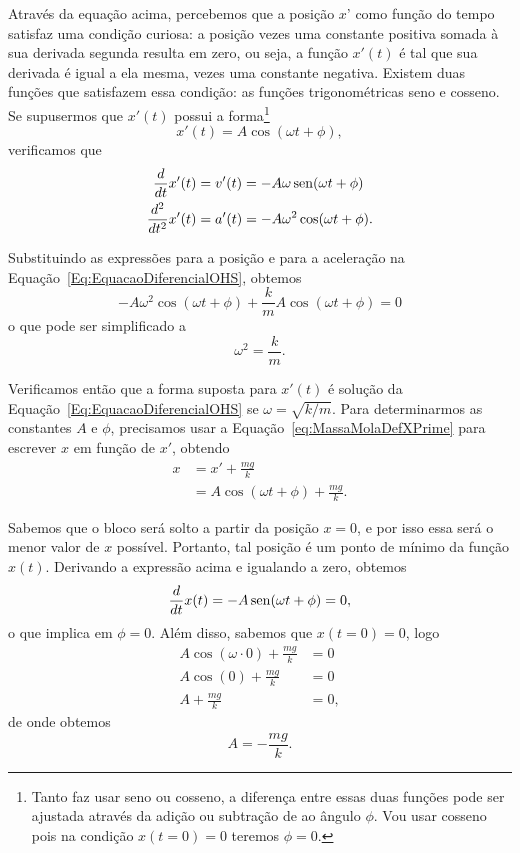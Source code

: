 Através da equação acima, percebemos que a posição $x$' como função do tempo satisfaz uma condição curiosa: a posição vezes uma constante positiva somada à  sua derivada segunda resulta em zero, ou seja, a função $x'(t)$ é tal que sua derivada é igual a ela mesma, vezes uma constante negativa. Existem duas funções que satisfazem essa condição: as funções trigonométricas seno e cosseno. Se supusermos que $x'(t)$ possui a forma\footnote{Tanto faz usar seno ou cosseno, a diferença entre essas duas funções pode ser ajustada através da adição ou subtração de  ao ângulo $\phi$. Vou usar cosseno pois na condição $x(t=0) = 0$ teremos $\phi = 0$.}
\begin{equation}
	x'(t) = A\cos(\omega t + \phi),
\end{equation}
%
verificamos que
\begin{align}
	\frac{d}{dt}x'(t) &= v'(t) = -A\omega\operatorname{sen}(\omega t + \phi) \\
	\frac{d^2}{dt^2} x'(t) &= a'(t) = -A\omega^2\cos(\omega t + \phi).
\end{align}

%
Substituindo as expressões para a posição e para a aceleração na Equação~\eqref{Eq:EquacaoDiferencialOHS}, obtemos
\begin{equation}
	-A\omega^2\cos(\omega t + \phi) + \frac{k}{m}A\cos(\omega t + \phi) = 0
\end{equation}
%
o que pode ser simplificado a
\begin{equation}
	\omega^2 = \frac{k}{m}.
\end{equation}

Verificamos então que a forma suposta para $x'(t)$ é solução da Equação~\eqref{Eq:EquacaoDiferencialOHS} se $\omega = \sqrt{k/m}$. Para determinarmos as constantes $A$ e $\phi$, precisamos usar a Equação~\eqref{eq:MassaMolaDefXPrime} para escrever $x$ em função de $x'$, obtendo
\begin{align}
	x &= x' + \frac{mg}{k} \\
	&= A \cos(\omega t + \phi) + \frac{mg}{k}.
\end{align}

Sabemos que o bloco será solto a partir da posição $x = 0$, e por isso essa será o menor valor de $x$ possível. Portanto, tal posição é um ponto de mínimo da função $x(t)$. Derivando a expressão acima e igualando a zero, obtemos
\begin{equation}
	\frac{d}{dt} x(t) = -A\operatorname{sen}(\omega t + \phi) = 0,
\end{equation}
%
o que implica em $\phi = 0$. Além disso, sabemos que $x(t = 0) = 0$, logo
\begin{align}
	A \cos(\omega \cdot 0) + \frac{mg}{k} &= 0\\
	A \cos (0) + \frac{mg}{k} &= 0 \\
	A + \frac{mg}{k} &= 0,
\end{align}
%
de onde obtemos
\begin{equation}
	A = - \frac{mg}{k}.
\end{equation}

